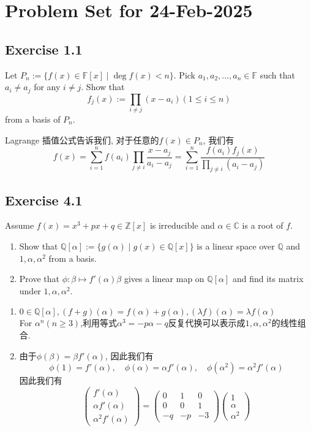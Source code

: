 \documentclass[11pt]{ctexart}
\theoremstyle{definition}
\numberwithin{equation}{section}
\newcommand{\op}[1]{\operatorname{#1}}%
\newcommand{\FF}{\mathbb{F}}%
\newcommand{\CC}{\mathbb{C}}
\newcommand{\QQ}{\mathbb{Q}}
\newcommand{\ZZ}{\mathbb{Z}}
\theoremstyle{definition}
\theoremstyle{remark}
\begin{document}
\section{Problem Set for 24-Feb-2025}
\subsection{Exercise 1.1}
Let $P_n:= \{f(x) \in \FF[x] \mid \op{deg} f(x) <n\}$. Pick $a_1,a_2,\ldots ,a_n \in \FF$ such that $a_i \neq a_j$ for any $i\neq j$. Show that \[f_j(x):= \prod_{i\neq j}(x-a_i)(1 \leq i \leq n)\]from a basis of $P_n$.
\begin{aaa}
    Lagrange 插值公式告诉我们, 对于任意的$f(x)\in P_n$, 我们有\[f(x) = \sum_{i=1}^n f(a_i)\prod_{j\neq i}\frac{x-a_j}{a_i-a_j}=\sum_{i=1}^{n}\frac{f(a_i)f_j(x)}{\prod_{j\neq i}(a_i-a_j)}\]
\end{aaa}
\subsection{Exercise 4.1}
Assume $f(x)=x^3 +px+q \in \ZZ[x]$ is irreducible and $\alpha \in \CC $ is a root of $f$.
\begin{enumerate}
    \item Show that $\QQ[\alpha]:=\{g(\alpha)\mid g(x)\in \QQ[x]\}$ is a linear space over $\QQ$ and $1,\alpha,\alpha^2$ from a basis.
    \item Prove that $\phi:\beta \mapsto f'(\alpha)\beta$ gives a linear map on $\QQ[\alpha]$ and find its matrix under $1,\alpha,\alpha^2$.
\end{enumerate}
\begin{aaa}
    \begin{enumerate}
        \item $0 \in \QQ[\alpha],(f+g)(\alpha)=f(\alpha)+g(\alpha),(\lambda f)(\alpha)=\lambda f(\alpha)$\\For $\alpha^n(n \geq 3)$,利用等式$\alpha^3=-p\alpha-q$反复代换可以表示成$1,\alpha,\alpha^2$的线性组合.\\
        \item 由于$\phi(\beta)=\beta f'(\alpha)$, 因此我们有\[\phi(1)=f'(\alpha),\quad \phi(\alpha)=\alpha f'(\alpha),\quad \phi(\alpha^2)=\alpha^2 f'(\alpha)\]因此我们有\[\begin{pmatrix}f'(\alpha)\\ \alpha f'(\alpha)\\ \alpha^2 f'(\alpha)\end{pmatrix}=\begin{pmatrix}0&1&0\\0&0&1\\-q&-p&-3\end{pmatrix}\begin{pmatrix}1\\ \alpha\\ \alpha^2\end{pmatrix}\]
    \end{enumerate}
\end{aaa}
\end{document}
